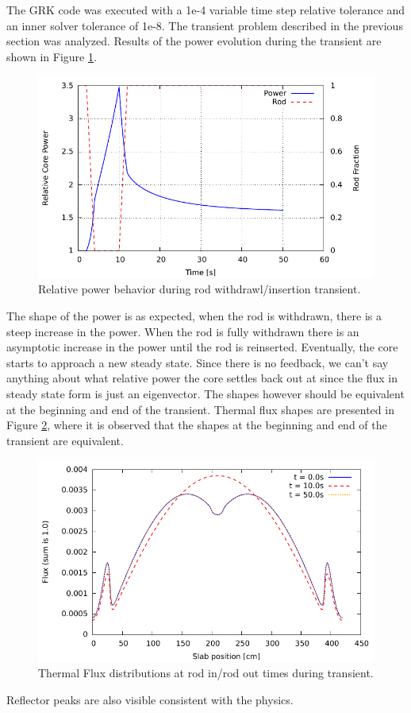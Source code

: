 \documentclass{ansconf}
\numberwithin{equation}{section}
\begin{document}
The GRK code was executed with a 1e-4 variable time step relative tolerance and an inner solver tolerance of 1e-8. The transient problem described in the previous section was analyzed. Results of the power evolution during the transient are shown in Figure \ref{fig:1D_power}.
\begin{figure} 
\centering \includegraphics[scale=1.00]{./figs/1D_power.pdf}
\caption{Relative power behavior during rod withdrawl/insertion transient.}
\label{fig:1D_power}
\end{figure}
The shape of the power is as expected, when the rod is withdrawn, there is a steep increase in the power. When the rod is fully withdrawn there is an asymptotic increase in the power until the rod is reinserted. Eventually, the core starts to approach a new steady state. Since there is no feedback, we can't say anything about what relative power the core settles back out at since the flux in steady state form is just an eigenvector. The shapes however should be equivalent at the beginning and end of the transient. Thermal flux shapes are presented in Figure \ref{fig:1D_fluxes}, where it is observed that the shapes at the beginning and end of the transient are equivalent.
\begin{figure} 
\centering \includegraphics[scale=1.00]{./figs/1D_fluxes.pdf}
\caption{Thermal Flux distributions at rod in/rod out times during transient.}
\label{fig:1D_fluxes}
\end{figure}
Reflector peaks are also visible consistent with the physics.
\end{document}
